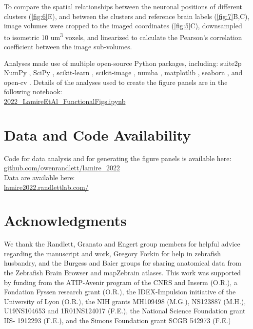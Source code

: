 \documentclass[9pt,lineno]{RandlettLab_elife}
\begin{document}
To compare the spatial relationships between the neuronal positions of different clusters (\autoref{fig:6}E), and between the clusters and reference brain labels (\autoref{fig:7}B,C), image volumes were cropped to the imaged coordinates (\autoref{fig:5}C), downsampled to isometric 10 um\textsuperscript{3} voxels, and linearized to calculate the Pearson's correlation coefficient between the image sub-volumes. 

Analyses made use of multiple open-source Python packages, including:
suite2p \cite{Pachitariu2017-ad}
NumPy \cite{Harris2020-bg}, SciPy \cite{Virtanen2020-sz}, scikit-learn \cite{Pedregosa2011-dj}, scikit-image \cite{Van_der_Walt2014-hx}, numba \cite{Lam2015-pq}, matplotlib \cite{Hunter2007-ub}, seaborn \cite{Waskom2021-ah}, and open-cv \cite{Bradski2000-qo}.
 Details of the analyses used to create the figure panels are in the following notebook: 
 \\ \href{https://nbviewer.org/github/owenrandlett/lamire_2022/blob/main/2022_LamireEtAl_FunctionalFigs.ipynb}{2022\_LamireEtAl\_FunctionalFigs.ipynb}

\section{Data and Code Availability}

Code for data analysis and for generating the figure panels is available here: \\
\href{https://github.com/owenrandlett/lamire_2022}{github.com/owenrandlett/lamire\_2022} \\
Data are available here: \\
\href{http://lamire2022.randlettlab.com/}{lamire2022.randlettlab.com/} 

\section{Acknowledgments}

We thank the Randlett, Granato and Engert group members for helpful advice regarding the manuscript and work, Gregory Forkin for help in zebrafish husbandry, and the Burgess and Baier groups for sharing anatomical data from the Zebrafish Brain Browser and mapZebrain atlases. This work was supported by funding from the ATIP-Avenir program of the CNRS and Inserm (O.R.), a Fondation Fyssen research grant (O.R.), the IDEX-Impulsion initiative of the University of Lyon (O.R.), the NIH grants MH109498 (M.G.), NS123887 (M.H.), U19NS104653 and 1R01NS124017 (F.E.), the National Science Foundation grant IIS- 1912293 (F.E.), and the Simons Foundation grant SCGB 542973 (F.E.)
\end{document}
